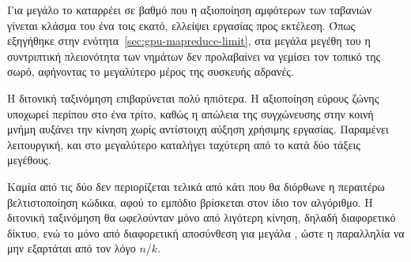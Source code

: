 Για μεγάλο  το  καταρρέει σε βαθμό που η αξιοποίηση
αμφότερων των ταβανιών γίνεται κλάσμα του ένα τοις εκατό, ελλείψει εργασίας
προς εκτέλεση. Όπως εξηγήθηκε στην ενότητα~\ref{sec:gpu-mapreduce-limit}, στα
μεγάλα μεγέθη του  η συντριπτική πλειονότητα των νημάτων δεν προλαβαίνει
να γεμίσει τον τοπικό της σωρό, αφήνοντας το μεγαλύτερο μέρος της συσκευής
αδρανές.

Η διτονική ταξινόμηση επιβαρύνεται πολύ ηπιότερα. Η αξιοποίηση εύρους ζώνης
υποχωρεί περίπου στο ένα τρίτο, καθώς η απώλεια της συγχώνευσης στην κοινή
μνήμη αυξάνει την κίνηση χωρίς αντίστοιχη αύξηση χρήσιμης εργασίας. Παραμένει
λειτουργική, και στο μεγαλύτερο  καταλήγει ταχύτερη από το
 κατά δύο τάξεις μεγέθους.

Καμία από τις δύο δεν περιορίζεται τελικά από κάτι που θα διόρθωνε η περαιτέρω
βελτιστοποίηση κώδικα, αφού το εμπόδιο βρίσκεται στον ίδιο τον αλγόριθμο. Η
διτονική ταξινόμηση θα ωφελούνταν μόνο από λιγότερη κίνηση, δηλαδή διαφορετικό
δίκτυο, ενώ το  μόνο από διαφορετική αποσύνθεση για μεγάλα
, ώστε η παραλληλία να μην εξαρτάται από τον λόγο $n/k$.
